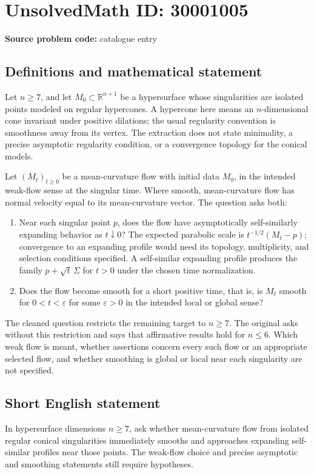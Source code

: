 \documentclass[11pt]{article}
\newcommand{\R}{\mathbb{R}}
\begin{document}
\section*{UnsolvedMath ID: 30001005}
\textbf{Source problem code:} catalogue entry
\subsection{Definitions and mathematical statement}
Let \(n\geq7\), and let \(M_0\subset\R^{n+1}\) be a hypersurface whose singularities are isolated points modeled on regular hypercones. A hypercone here means an \(n\)-dimensional cone invariant under positive dilations; the usual regularity convention is smoothness away from its vertex. The extraction does not state minimality, a precise asymptotic regularity condition, or a convergence topology for the conical models.

Let \((M_t)_{t\geq0}\) be a mean-curvature flow with initial data \(M_0\), in the intended weak-flow sense at the singular time. Where smooth, mean-curvature flow has normal velocity equal to its mean-curvature vector. The question asks both:
\begin{enumerate}
\item Near each singular point \(p\), does the flow have asymptotically self-similarly expanding behavior as \(t\downarrow0\)? The expected parabolic scale is \(t^{-1/2}(M_t-p)\); convergence to an expanding profile would need its topology, multiplicity, and selection conditions specified. A self-similar expanding profile produces the family \(p+\sqrt t\,\Sigma\) for \(t>0\) under the chosen time normalization.
\item Does the flow become smooth for a short positive time, that is, is \(M_t\) smooth for \(0<t<\varepsilon\) for some \(\varepsilon>0\) in the intended local or global sense?
\end{enumerate}
The cleaned question restricts the remaining target to \(n\geq7\). The original asks without this restriction and says that affirmative results hold for \(n\leq6\). Which weak flow is meant, whether assertions concern every such flow or an appropriate selected flow, and whether smoothing is global or local near each singularity are not specified.
\subsection{Short English statement}
In hypersurface dimensions \(n\geq7\), ask whether mean-curvature flow from isolated regular conical singularities immediately smooths and approaches expanding self-similar profiles near those points. The weak-flow choice and precise asymptotic and smoothing statements still require hypotheses.
\end{document}
